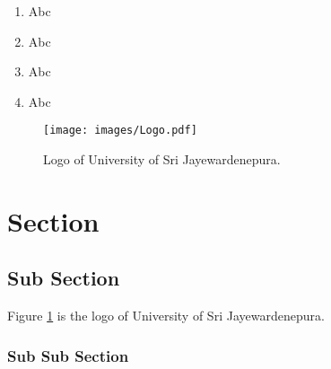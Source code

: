 \label{chapter:research}

\Blindtext [1]

\begin{enumerate}
\item Abc
\item Abc
\item Abc
\item Abc
\end{enumerate}

\begin{figure}[!b]
\begin{center}
   \texttt{[image: images/Logo.pdf]}
\end{center}
   \caption{\label{img:usj_logo} Logo of University of Sri Jayewardenepura.}
\end{figure}

\section{Section}
\Blindtext [1]

\subsection{Sub Section}
\Blindtext [1]
Figure \ref{img:usj_logo} is the logo of University of Sri Jayewardenepura. \Blindtext [1]

\subsubsection{Sub Sub Section}
\Blindtext [1]



